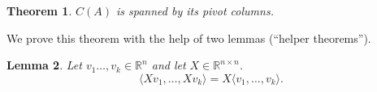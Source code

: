 \documentclass[fullpage]{amsart}
\newcommand{\RR}{\mathbb{R}}
\newtheorem{theorem}{Theorem}[section]
\newtheorem{lemma}[theorem]{Lemma}
\theoremstyle{definition}
\begin{document}
\begin{theorem}\label{theorem:pivot_cols_span_col_space}
$C(A)$ is spanned by its pivot columns.
\end{theorem}

We prove this theorem with the help of two lemmas (``helper theorems'').

\begin{lemma}
Let $v_1\ldots,v_k\in\RR^n$ and let $X\in\RR^{n\times n}$. 
  $$\langle X v_1,\ldots,X v_k\rangle = X\langle v_1,\ldots,v_k\rangle.$$
\end{lemma}
\end{document}
